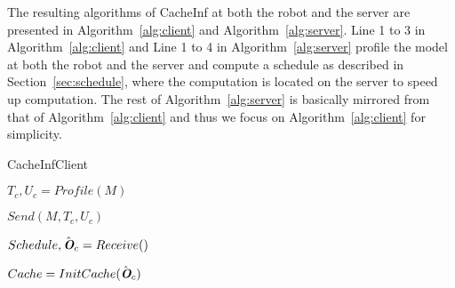 The resulting algorithms of CacheInf at both the robot and the server are presented in Algorithm~\ref{alg:client} and Algorithm~\ref{alg:server}.
Line 1 to 3 in Algorithm~\ref{alg:client} and Line 1 to 4 in Algorithm~\ref{alg:server} profile the model at both the robot and the server and compute a schedule as described in Section~\ref{sec:schedule}, where the computation is located on the server to speed up computation.
The rest of Algorithm~\ref{alg:server} is basically mirrored from that of Algorithm~\ref{alg:client} and thus we focus on Algorithm~\ref{alg:client} for simplicity.

\begin{algorithm}[htbp]
    \caption{\small CacheInfClient\label{alg:client}}
    \DontPrintSemicolon
    
        $T_c, U_c = Profile(M)$
    
        $Send(M, T_c, U_c)$
    
        $Schedule, \hat{\textit{\textbf{O}}}_c = Receive()$

        $Cache = InitCache(\hat{\textit{\textbf{O}}}_c)$


\end{algorithm}
